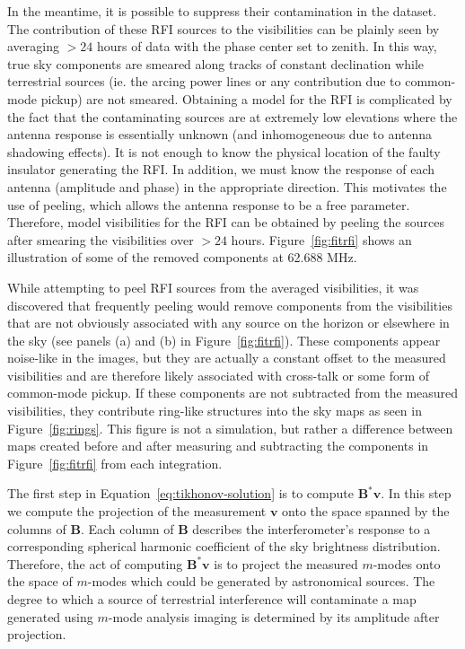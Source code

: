 \documentclass[twocolumn]{aastex61}
\renewcommand{\b}{\pmb}
\begin{document}
In the meantime, it is possible to suppress their contamination in the dataset. The contribution of
these RFI sources to the visibilities can be plainly seen by averaging $>24$ hours of data with the
phase center set to zenith. In this way, true sky components are smeared along tracks of constant
declination while terrestrial sources (ie. the arcing power lines or any contribution due to
common-mode pickup) are not smeared.  Obtaining a model for the RFI is complicated by the fact that
the contaminating sources are at extremely low elevations where the antenna response is essentially
unknown (and inhomogeneous due to antenna shadowing effects). It is not enough to know the physical
location of the faulty insulator generating the RFI. In addition, we must know the response of each
antenna (amplitude and phase) in the appropriate direction. This motivates the use of peeling, which
allows the antenna response to be a free parameter.  Therefore, model visibilities for the RFI can
be obtained by peeling the sources after smearing the visibilities over $>24$ hours.
Figure~\ref{fig:fitrfi} shows an illustration of some of the removed components at 62.688 MHz.

While attempting to peel RFI sources from the averaged visibilities, it was discovered that
frequently peeling would remove components from the visibilities that are not obviously associated
with any source on the horizon or elsewhere in the sky (see panels (a) and (b) in
Figure~\ref{fig:fitrfi}).  These components appear noise-like in the images, but they are actually a
constant offset to the measured visibilities and are therefore likely associated with cross-talk or
some form of common-mode pickup. If these components are not subtracted from the measured
visibilities, they contribute ring-like structures into the sky maps as seen in
Figure~\ref{fig:rings}. This figure is not a simulation, but rather a difference between maps
created before and after measuring and subtracting the components in Figure~\ref{fig:fitrfi} from
each integration.

The first step in Equation~\ref{eq:tikhonov-solution} is to compute $\b B^*\b v$. In this step we
compute the projection of the measurement $\b v$ onto the space spanned by the columns of $\b B$.
Each column of $\b B$ describes the interferometer's response to a corresponding spherical harmonic
coefficient of the sky brightness distribution. Therefore, the act of computing $\b B^*\b v$ is to
project the measured $m$-modes onto the space of $m$-modes which could be generated by astronomical
sources. The degree to which a source of terrestrial interference will contaminate a map generated
using $m$-mode analysis imaging is determined by its amplitude after projection.
\end{document}
